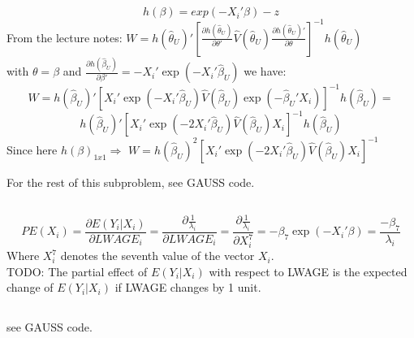 \documentclass[11pt]{article}
\theoremstyle{break}
\begin{document}
\subsection{}
$$h(\beta) = exp(-X_i'\beta) - z$$
From the lecture notes: $W=h(\hat{\theta}_U)'[\frac{\partial h(\hat{\theta}_U)}{\partial \theta'}\hat{V}(\hat{\theta}_U)\frac{\partial h(\hat{\theta}_U)'}{\partial \theta}]^{-1}h(\hat{\theta}_U)$ \\
with $\theta=\beta$ and $\frac{\partial h(\hat{\beta}_U)}{\partial \beta'} = -X_i'\exp(-X_i'\hat{\beta}_U)$ we have: \\
$$W=h(\hat{\beta}_U)'[X_i'\exp(-X_i'\hat{\beta}_U)\hat{V}(\hat{\beta}_U)\exp(-\hat{\beta}_U'X_i)]^{-1}h(\hat{\beta}_U) = $$ 
$$ h(\hat{\beta}_U)'[X_i'\exp(-2X_i'\hat{\beta}_U)\hat{V}(\hat{\beta}_U)X_i]^{-1}h(\hat{\beta}_U)$$ Since here $h(\beta)_{1x1} \Rightarrow$ $W=h(\hat{\beta}_U)^2[X_i'\exp(-2X_i'\hat{\beta}_U)\hat{V}(\hat{\beta}_U)X_i]^{-1}$

For the rest of this subproblem, see GAUSS code.

\subsection{}
$$PE(X_i) = \frac{\partial E(Y_i|X_i)}{\partial LWAGE_i} = \frac{\partial{\frac{1}{\lambda_i}}}{\partial LWAGE_i} = \frac{\partial{\frac{1}{\lambda_i}}}{\partial X_i^7} = -\beta_7\exp(-X_i'\beta) = \frac{-\beta_7}{\lambda_i}$$ Where $X_i^7$ denotes the seventh value of the vector $X_i$.
\\

TODO: The partial effect of $E(Y_i|X_i)$ with respect to LWAGE is the expected change of $E(Y_i|X_i)$ if LWAGE changes by 1 unit.

\subsection{}
see GAUSS code.
\end{document}
